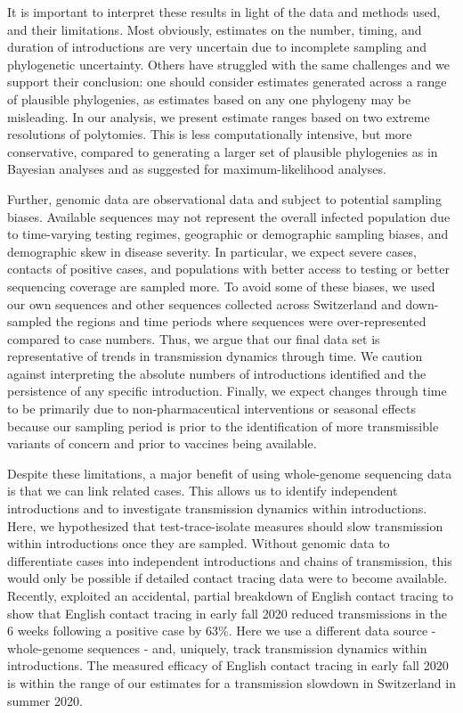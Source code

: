 \documentclass[11pt,twoside,lineno]{pnas-new} %
\begin{document}
It is important to interpret these results in light of the data and methods used, and their limitations. Most obviously, estimates on the number, timing, and duration of introductions are very uncertain due to incomplete sampling and phylogenetic uncertainty. Others have struggled with the same challenges \cite{Morel2021} and we support their conclusion: one should consider estimates generated across a range of plausible phylogenies, as estimates based on any one phylogeny may be misleading. In our analysis, we present estimate ranges based on two extreme resolutions of polytomies. This is less computationally intensive, but more conservative, compared to generating a larger set of plausible phylogenies as in Bayesian analyses and as \cite{Morel2021} suggested for maximum-likelihood analyses.

Further, genomic data are observational data and subject to potential sampling biases. Available sequences may not represent the overall infected population due to time-varying testing regimes, geographic or demographic sampling biases, and demographic skew in disease severity. In particular, we expect severe cases, contacts of positive cases, and populations with better access to testing or better sequencing coverage are sampled more. To avoid some of these biases, we used our own sequences and other sequences collected across Switzerland and down-sampled the regions and time periods where sequences were over-represented compared to case numbers. Thus, we argue that our final data set is representative of trends in transmission dynamics through time. We caution against interpreting the absolute numbers of introductions identified and the persistence of any specific introduction. Finally, we expect changes through time to be primarily due to non-pharmaceutical interventions or seasonal effects because our sampling period is prior to the identification of more transmissible variants of concern and prior to vaccines being available. 

Despite these limitations, a major benefit of using whole-genome sequencing data is that we can link related cases. This allows us to identify independent introductions and to investigate transmission dynamics within introductions. Here, we hypothesized that test-trace-isolate measures should slow transmission within introductions once they are sampled. Without genomic data to differentiate cases into independent introductions and chains of transmission, this would only be possible if detailed contact tracing data were to become available. Recently, \cite{Fetzer2021} exploited an accidental, partial breakdown of English contact tracing to show that English contact tracing in early fall 2020 reduced transmissions in the 6 weeks following a positive case by 63\%. Here we use a different data source - whole-genome sequences - and, uniquely, track transmission dynamics within introductions. The measured efficacy of English contact tracing in early fall 2020 is within the range of our estimates for a transmission slowdown in Switzerland in summer 2020.
\end{document}
